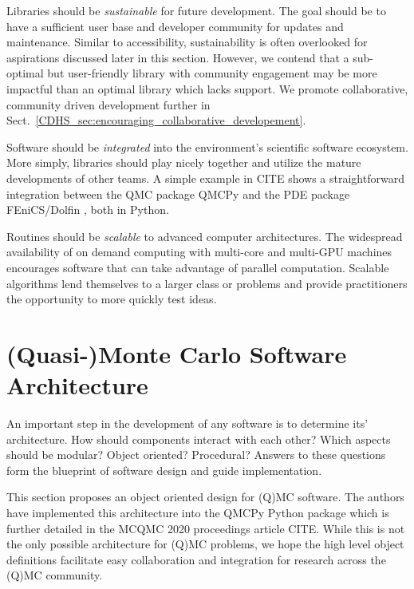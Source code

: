 \documentclass[graybox]{svmult}
\newcommand{\AGSComment}[1]{{\color{red} #1}}
\begin{document}
Libraries should be \emph{sustainable} for future development. The goal should be to have a sufficient user base and developer community for updates and maintenance. Similar to accessibility, sustainability is often overlooked for aspirations discussed later in this section. However, we contend that a sub-optimal but user-friendly library with community engagement may be more impactful than an optimal library which lacks support. We promote collaborative, community driven development further in Sect.\ \ref{CDHS_sec:encouraging_collaborative_developement}.

Software should be \emph{integrated} into the environment's scientific software ecosystem. More simply, libraries should play nicely together and utilize the mature developments of other teams. A simple example in \AGSComment{CITE} shows a straightforward integration between the QMC package QMCPy \cite{QMCPy2020a} and the PDE package FEniCS/Dolfin \cite{LoggEtal_10_2012}, both in Python.

Routines should be \emph{scalable} to advanced computer architectures. The widespread availability of on demand computing with multi-core and multi-GPU machines encourages software that can take advantage of parallel computation. Scalable algorithms lend themselves to a larger class or problems and provide practitioners the opportunity to more quickly test ideas.

\section{(Quasi-)Monte Carlo Software Architecture} \label{CDHS_sec:qmc_software_architecture}

An important step in the development of any software is to determine its' architecture. How should components interact with each other? Which aspects should be modular? Object oriented? Procedural? Answers to these questions form the blueprint of software design and guide implementation.

This section proposes an object oriented design for (Q)MC software. The authors have implemented this architecture into the QMCPy \cite{QMCPy2020a} Python package which is further detailed in the MCQMC 2020 proceedings article \AGSComment{CITE}. While this is not the only possible architecture for (Q)MC problems, we hope the high level object definitions facilitate easy collaboration and integration for research across the (Q)MC community.
\end{document}
